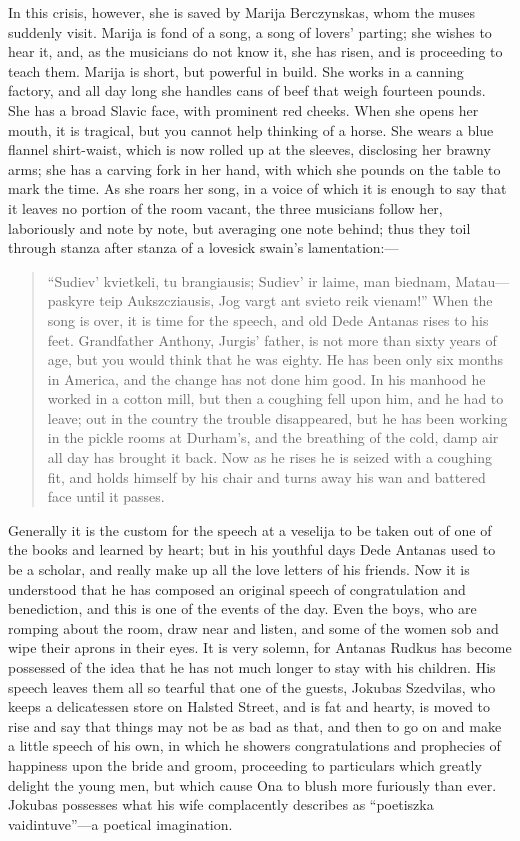 \documentclass[
]{book}
\begin{document}
In this crisis, however, she is saved by Marija Berczynskas, whom the muses suddenly visit. Marija is fond of a song, a song of lovers' parting; she wishes to hear it, and, as the musicians do not know it, she has risen, and is proceeding to teach them. Marija is short, but powerful in build. She works in a canning factory, and all day long she handles cans of beef that weigh fourteen pounds. She has a broad Slavic face, with prominent red cheeks. When she opens her mouth, it is tragical, but you cannot help thinking of a horse. She wears a blue flannel shirt-waist, which is now rolled up at the sleeves, disclosing her brawny arms; she has a carving fork in her hand, with which she pounds on the table to mark the time. As she roars her song, in a voice of which it is enough to say that it leaves no portion of the room vacant, the three musicians follow her, laboriously and note by note, but averaging one note behind; thus they toil through stanza after stanza of a lovesick swain's lamentation:---

\begin{quote}
``Sudiev' kvietkeli, tu brangiausis;
Sudiev' ir laime, man biednam,
Matau---paskyre teip Aukszcziausis,
Jog vargt ant svieto reik vienam!''
When the song is over, it is time for the speech, and old Dede Antanas rises to his feet. Grandfather Anthony, Jurgis' father, is not more than sixty years of age, but you would think that he was eighty. He has been only six months in America, and the change has not done him good. In his manhood he worked in a cotton mill, but then a coughing fell upon him, and he had to leave; out in the country the trouble disappeared, but he has been working in the pickle rooms at Durham's, and the breathing of the cold, damp air all day has brought it back. Now as he rises he is seized with a coughing fit, and holds himself by his chair and turns away his wan and battered face until it passes.
\end{quote}

Generally it is the custom for the speech at a veselija to be taken out of one of the books and learned by heart; but in his youthful days Dede Antanas used to be a scholar, and really make up all the love letters of his friends. Now it is understood that he has composed an original speech of congratulation and benediction, and this is one of the events of the day. Even the boys, who are romping about the room, draw near and listen, and some of the women sob and wipe their aprons in their eyes. It is very solemn, for Antanas Rudkus has become possessed of the idea that he has not much longer to stay with his children. His speech leaves them all so tearful that one of the guests, Jokubas Szedvilas, who keeps a delicatessen store on Halsted Street, and is fat and hearty, is moved to rise and say that things may not be as bad as that, and then to go on and make a little speech of his own, in which he showers congratulations and prophecies of happiness upon the bride and groom, proceeding to particulars which greatly delight the young men, but which cause Ona to blush more furiously than ever. Jokubas possesses what his wife complacently describes as ``poetiszka vaidintuve''---a poetical imagination.
\end{document}
